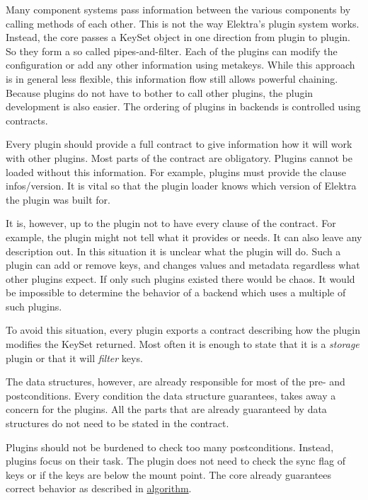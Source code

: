 Many component systems pass information between the various components by calling methods of each other. This is not the way Elektra’s plugin system works. Instead, the core passes a {\ttfamily Key\+Set} object in one direction from plugin to plugin. So they form a so called pipes-\/and-\/filter. Each of the plugins can modify the configuration or add any other information using metakeys. While this approach is in general less flexible, this information flow still allows powerful chaining. Because plugins do not have to bother to call other plugins, the plugin development is also easier. The ordering of plugins in backends is controlled using contracts.

Every plugin should provide a full contract to give information how it will work with other plugins. Most parts of the contract are obligatory. Plugins cannot be loaded without this information. For example, plugins must provide the clause {\ttfamily infos/version}. It is vital so that the plugin loader knows which version of Elektra the plugin was built for.

It is, however, up to the plugin not to have every clause of the contract. For example, the plugin might not tell what it provides or needs. It can also leave any description out. In this situation it is unclear what the plugin will do. Such a plugin can add or remove keys, and changes values and metadata regardless what other plugins expect. If only such plugins existed there would be chaos. It would be impossible to determine the behavior of a backend which uses a multiple of such plugins.

To avoid this situation, every plugin exports a contract describing how the plugin modifies the {\ttfamily Key\+Set} {\ttfamily returned}. Most often it is enough to state that it is a {\itshape storage} plugin or that it will {\itshape filter} keys.

The data structures, however, are already responsible for most of the pre-\/ and postconditions. Every condition the data structure guarantees, takes away a concern for the plugins. All the parts that are already guaranteed by data structures do not need to be stated in the contract.

Plugins should not be burdened to check too many postconditions. Instead, plugins focus on their task. The plugin does not need to check the sync flag of keys or if the keys are below the mount point. The core already guarantees correct behavior as described in \mbox{\hyperlink{doc_dev_algorithm_md}{algorithm}}.

